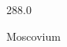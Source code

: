 \documentclass[12pt]{article}
\begin{document}
\hfill{}
\vfill
\begin{center}
  {\fontsize{50}{60}
  }

  \vspace{1em}

  288.0

Moscovium
\end{center}
\vfill
\end{document}
